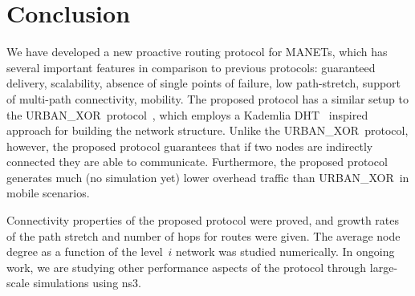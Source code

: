 \documentclass[conference]{IEEEtran}
\theoremstyle{definition}
\newcommand{\urbanxor}{URBAN\_XOR}
\begin{document}
\section{Conclusion}
\label{sec:conclusion}

We have developed a new proactive routing protocol for MANETs, which has several important features in comparison to previous protocols: guaranteed delivery, scalability, absence of single points of failure, low path-stretch, support of multi-path connectivity, {\color{orange}mobility}. The proposed protocol has a similar setup to the \urbanxor\ protocol~\cite{Pasquini}, which employs a Kademlia DHT~\cite{kademlia} inspired approach for building the network structure. Unlike the \urbanxor\ protocol, however, the proposed protocol guarantees that if two nodes are indirectly connected they are able to communicate. Furthermore, the proposed protocol generates {\color{orange}much (no simulation yet)} lower overhead traffic than \urbanxor\ in mobile scenarios.  

Connectivity properties of the proposed protocol were proved, and growth rates of the path stretch and number of hops for routes were given. The average node degree as a function of the level~$i$ network was studied numerically. In ongoing work, we are studying other performance aspects of the protocol through large-scale simulations {\color{orange}using ns3}.




\end{document}
